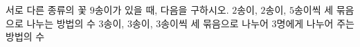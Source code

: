 서로 다른 종류의 꽃 $9$송이가 있을 때, 다음을 구하시오.
 $2$송이, $2$송이, $5$송이씩 세 묶음으로 나누는 방법의 수
 $3$송이, $3$송이, $3$송이씩 세 묶음으로 나누어 $3$명에게 나누어 주는 방법의 수

